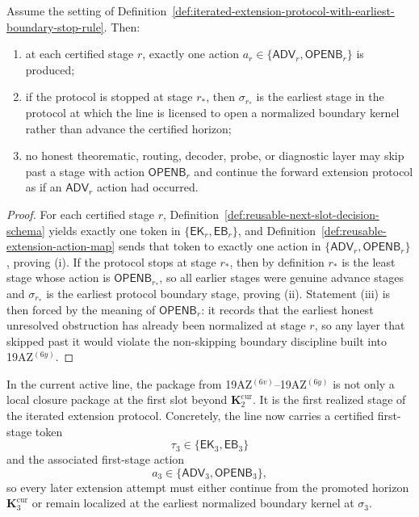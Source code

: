 \begin{proposition}
\label{prop:iterated-extension-protocol-is-well-defined-and-locally-non-skipping}
Assume the setting of Definition~\ref{def:iterated-extension-protocol-with-earliest-boundary-stop-rule}. Then:
\begin{enumerate}[label=(\roman*)]
 \item at each certified stage $r$, exactly one action $a_r\in\{\mathsf{ADV}_r,\mathsf{OPENB}_r\}$ is produced;
 \item if the protocol is stopped at stage $r_*$, then $\sigma_{r_*}$ is the earliest stage in the protocol at which the line is licensed to open a normalized boundary kernel rather than advance the certified horizon;
 \item no honest theorematic, routing, decoder, probe, or diagnostic layer may skip past a stage with action $\mathsf{OPENB}_r$ and continue the forward extension protocol as if an $\mathsf{ADV}_r$ action had occurred.
\end{enumerate}
\end{proposition}

\begin{proof}
For each certified stage $r$, Definition~\ref{def:reusable-next-slot-decision-schema} yields exactly one token in $\{\mathsf{EK}_r,\mathsf{EB}_r\}$, and Definition~\ref{def:reusable-extension-action-map} sends that token to exactly one action in $\{\mathsf{ADV}_r,\mathsf{OPENB}_r\}$, proving (i). If the protocol stops at stage $r_*$, then by definition $r_*$ is the least stage whose action is $\mathsf{OPENB}_{r_*}$, so all earlier stages were genuine advance stages and $\sigma_{r_*}$ is the earliest protocol boundary stage, proving (ii). Statement (iii) is then forced by the meaning of $\mathsf{OPENB}_r$: it records that the earliest honest unresolved obstruction has already been normalized at stage $r$, so any layer that skipped past it would violate the non-skipping boundary discipline built into 19AZ$^{(6y)}$.
\end{proof}

\begin{corollary}
\label{cor:present-sigma3-package-is-first-step-of-iterated-extension-protocol}
In the current active line, the package from 19AZ$^{(6v)}$--19AZ$^{(6y)}$ is not only a local closure package at the first slot beyond $\mathbf K_2^{\mathrm{cur}}$. It is the first realized stage of the iterated extension protocol. Concretely, the line now carries a certified first-stage token
\[
 \tau_3 \in \{\mathsf{EK}_3,\mathsf{EB}_3\}
\]
and the associated first-stage action
\[
 a_3 \in \{\mathsf{ADV}_3,\mathsf{OPENB}_3\},
\]
so every later extension attempt must either continue from the promoted horizon $\mathbf K_3^{\mathrm{cur}}$ or remain localized at the earliest normalized boundary kernel at $\sigma_3$.
\end{corollary}

